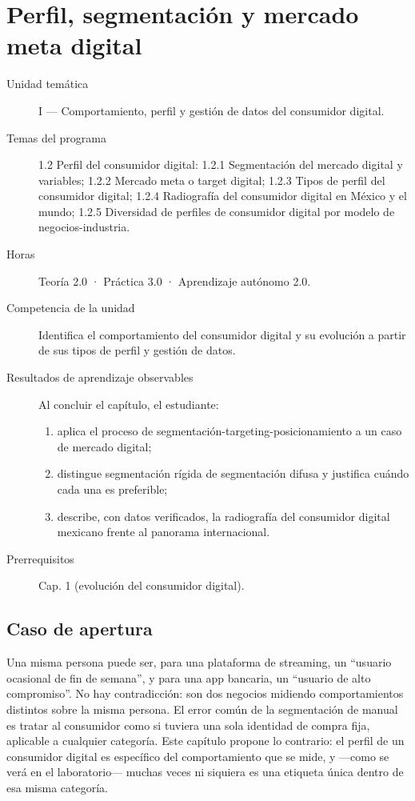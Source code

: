 \chapter{Perfil, segmentación y mercado meta digital}
\label{cap:02}

\begin{cajaFicha}
\begin{description}
  \item[Unidad temática] I — Comportamiento, perfil y gestión de datos del consumidor digital.
  \item[Temas del programa] 1.2 Perfil del consumidor digital: 1.2.1 Segmentación del mercado digital y variables; 1.2.2 Mercado meta o target digital; 1.2.3 Tipos de perfil del consumidor digital; 1.2.4 Radiografía del consumidor digital en México y el mundo; 1.2.5 Diversidad de perfiles de consumidor digital por modelo de negocios-industria.
  \item[Horas] Teoría 2.0 · Práctica 3.0 · Aprendizaje autónomo 2.0.
  \item[Competencia de la unidad] Identifica el comportamiento del consumidor digital y su evolución a partir de sus tipos de perfil y gestión de datos.
  \item[Resultados de aprendizaje observables] Al concluir el capítulo, el estudiante:
  \begin{enumerate}
    \item aplica el proceso de segmentación-targeting-posicionamiento a un caso de mercado digital;
    \item distingue segmentación rígida de segmentación difusa y justifica cuándo cada una es preferible;
    \item describe, con datos verificados, la radiografía del consumidor digital mexicano frente al panorama internacional.
  \end{enumerate}
  \item[Prerrequisitos] Cap. 1 (evolución del consumidor digital).
\end{description}
\end{cajaFicha}

\section{Caso de apertura}

Una misma persona puede ser, para una plataforma de streaming, un
\enquote{usuario ocasional de fin de semana}, y para una app bancaria, un
\enquote{usuario de alto compromiso}. No hay contradicción: son dos negocios
midiendo comportamientos distintos sobre la misma persona. El error común de
la segmentación de manual es tratar al consumidor como si tuviera una sola
identidad de compra fija, aplicable a cualquier categoría. Este capítulo
propone lo contrario: el perfil de un consumidor digital es específico del
comportamiento que se mide, y —como se verá en el laboratorio— muchas veces
ni siquiera es una etiqueta única dentro de esa misma categoría.

